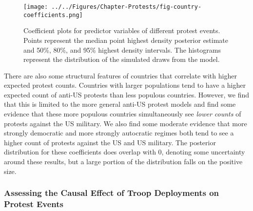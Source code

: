 \begin{figure}[t]
	\centering\texttt{[image: ../../Figures/Chapter-Protests/fig-country-coefficients.png]}
	\caption{Coefficient plots for predictor variables of different protest events. Points represent the median point highest density posterior estimate and 50\%, 80\%, and 95\% highest density intervals. The histograms represent the distribution of the simulated draws from the model.}
	\label{fig:coefplotcountryprotestmodels}
\end{figure}

There are also some structural features of countries that correlate with higher expected protest counts. Countries with larger populations tend to have a higher expected count of anti-US protests than less populous countries. However, we find that this is limited to the more general anti-US protest models and find some evidence that these more populous countries simultaneously see \textit{lower counts} of protests against the US military. We also find some moderate evidence that more strongly democratic and more strongly autocratic regimes both tend to see a higher count of protests against the US and US military. The posterior distribution for these coefficients does overlap with 0, denoting some uncertainty around these results, but a large portion of the distribution falls on the positive size. 


\subsubsection{Assessing the Causal Effect of Troop Deployments on Protest Events}

